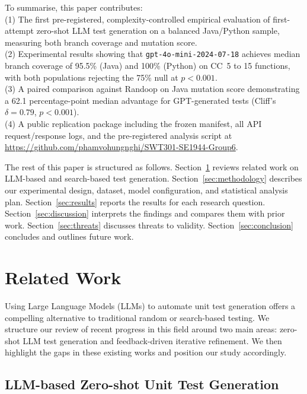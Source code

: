 \documentclass[conference]{IEEEtran}
\begin{document}
To summarise, this paper contributes:\\
(1) The first pre-registered, complexity-controlled empirical evaluation of first-attempt zero-shot LLM test generation on a balanced Java/Python sample, measuring both branch coverage and mutation score.\\
(2) Experimental results showing that \texttt{gpt-4o-mini-2024-07-18} achieves median branch coverage of 95.5\% (Java) and 100\% (Python) on CC~5 to 15 functions, with both populations rejecting the 75\% null at $p < 0.001$.\\
(3) A paired comparison against Randoop on Java mutation score demonstrating a 62.1 percentage-point median advantage for GPT-generated tests (Cliff's $\delta = 0.79$, $p < 0.001$).\\
(4) A public replication package including the frozen manifest, all API request/response logs, and the pre-registered analysis script at \url{https://github.com/phamvohungnghi/SWT301-SE1944-Group6}.

The rest of this paper is structured as follows. Section~\ref{sec:related_work} reviews related work on LLM-based and search-based test generation. Section~\ref{sec:methodology} describes our experimental design, dataset, model configuration, and statistical analysis plan. Section~\ref{sec:results} reports the results for each research question. Section~\ref{sec:discussion} interprets the findings and compares them with prior work. Section~\ref{sec:threats} discusses threats to validity. Section~\ref{sec:conclusion} concludes and outlines future work.


\section{Related Work}
\label{sec:related_work}

Using Large Language Models (LLMs) to automate unit test generation offers a compelling alternative to traditional random or search-based testing. We structure our review of recent progress in this field around two main areas: zero-shot LLM test generation and feedback-driven iterative refinement. We then highlight the gaps in these existing works and position our study accordingly.

\subsection{LLM-based Zero-shot Unit Test Generation}
\label{subsec:zero_shot_gen}
\end{document}
